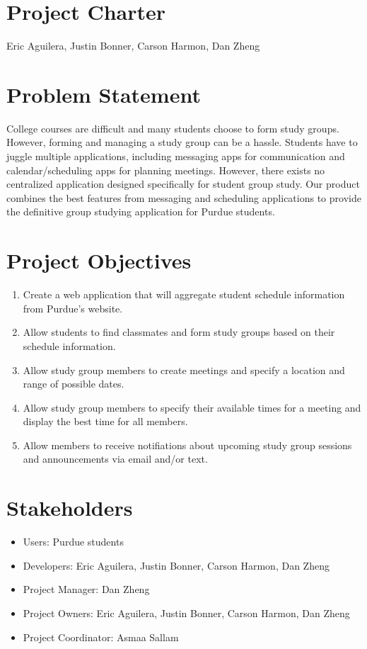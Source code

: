\documentclass[12pt]{article}
\newcommand{\hwTitle}{Project Charter}
\newcommand{\authorName}{Eric Aguilera, Justin Bonner, Carson Harmon, Dan Zheng}
\begin{document}
\section*{\Large \centering \hwTitle}
{\centering \authorName \par}

\section{Problem Statement}

College courses are difficult and many students choose to form study groups. However, forming and managing a study group can be a hassle. Students have to juggle multiple applications, including messaging apps for communication and calendar/scheduling apps for planning meetings. However, there exists no centralized application designed specifically for student group study. Our product combines the best features from messaging and scheduling applications to provide the definitive group studying application for Purdue students.

\section{Project Objectives}
\begin{enumerate}[nolistsep]
    \item Create a web application that will aggregate student schedule information from Purdue's website.
    \item Allow students to find classmates and form study groups based on their schedule information.
    \item Allow study group members to create meetings and specify a location and range of possible dates.
    \item Allow study group members to specify their available times for a meeting and display the best time for all members.
    \item Allow members to receive notifiations about upcoming study group sessions and announcements via email and/or text.
\end{enumerate}

\section{Stakeholders}
\begin{itemize}[nolistsep]
    \item Users: Purdue students
    \item Developers: Eric Aguilera, Justin Bonner, Carson Harmon, Dan Zheng
    \item Project Manager: Dan Zheng
    \item Project Owners: Eric Aguilera, Justin Bonner, Carson Harmon, Dan Zheng
    \item Project Coordinator: Asmaa Sallam
\end{itemize}
\end{document}
